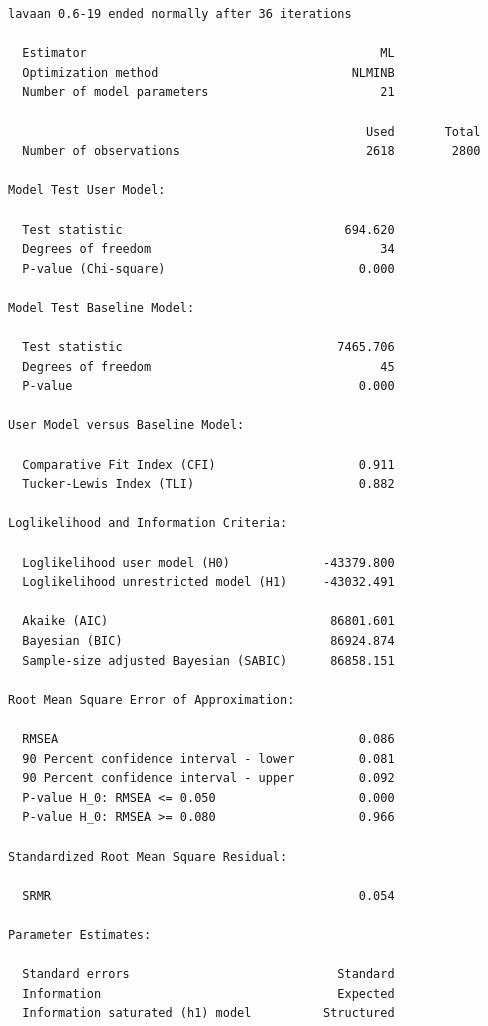 \documentclass[
  letterpaper,
  DIV=11,
  numbers=noendperiod]{scrreprt}
\begin{document}
\begin{verbatim}
lavaan 0.6-19 ended normally after 36 iterations

  Estimator                                         ML
  Optimization method                           NLMINB
  Number of model parameters                        21

                                                  Used       Total
  Number of observations                          2618        2800

Model Test User Model:
                                                      
  Test statistic                               694.620
  Degrees of freedom                                34
  P-value (Chi-square)                           0.000

Model Test Baseline Model:

  Test statistic                              7465.706
  Degrees of freedom                                45
  P-value                                        0.000

User Model versus Baseline Model:

  Comparative Fit Index (CFI)                    0.911
  Tucker-Lewis Index (TLI)                       0.882

Loglikelihood and Information Criteria:

  Loglikelihood user model (H0)             -43379.800
  Loglikelihood unrestricted model (H1)     -43032.491
                                                      
  Akaike (AIC)                               86801.601
  Bayesian (BIC)                             86924.874
  Sample-size adjusted Bayesian (SABIC)      86858.151

Root Mean Square Error of Approximation:

  RMSEA                                          0.086
  90 Percent confidence interval - lower         0.081
  90 Percent confidence interval - upper         0.092
  P-value H_0: RMSEA <= 0.050                    0.000
  P-value H_0: RMSEA >= 0.080                    0.966

Standardized Root Mean Square Residual:

  SRMR                                           0.054

Parameter Estimates:

  Standard errors                             Standard
  Information                                 Expected
  Information saturated (h1) model          Structured


\end{verbatim}
\end{document}
